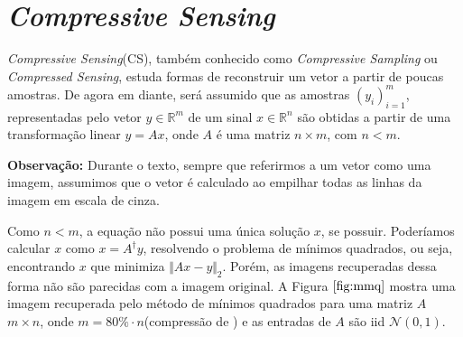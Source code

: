\chapter{\textit{Compressive Sensing}}

\textit{Compressive Sensing}(CS), também conhecido como \textit{Compressive Sampling} ou \textit{Compressed Sensing},  estuda formas de reconstruir um vetor a partir de poucas amostras. De agora em diante, será assumido que as amostras $(y_i)_{i = 1}^m$, representadas pelo vetor $y \in \mathbb{R}^m$ de um sinal $x \in \mathbb{R}^n$ são obtidas a partir de uma transformação linear $y = Ax$, onde $A$ é uma matriz $n \times m$, com $n < m$.

{\bf Observação:} Durante o texto, sempre que referirmos a um vetor como uma imagem, assumimos que o vetor é calculado ao empilhar todas as linhas da imagem em escala de cinza.

Como $n < m$, a equação não possui uma única solução $x$, se possuir. Poderíamos calcular $x$ como $x = A^{\dagger} y$, resolvendo o problema de mínimos quadrados, ou seja, encontrando $x$ que minimiza $\Vert Ax - y \Vert_2$. Porém, as imagens recuperadas dessa forma não são parecidas com a imagem original. A Figura $\ref{fig:mmq}$ mostra uma imagem recuperada pelo método de mínimos quadrados para uma matriz $A$ $m \times n$, onde $m = 80 \% \cdot n$(compressão de  ) e as entradas de $A$ são iid $\mathcal{N}(0,1)$.

